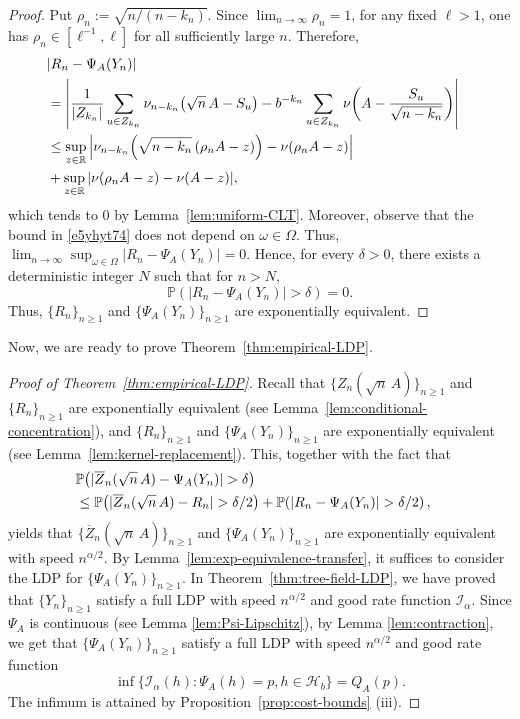 \documentclass[a4paper, 11pt]{article}
\newcommand{\1}{\mathbf 1}
\theoremstyle{plain}
\begin{document}
\begin{proof}
Put \(\rho_n:=\sqrt{n/(n-k_n)}\). Since $\lim_{n\to\infty}\rho_n=1$, for any fixed \(\ell>1\), one has
\(\rho_n\in[\ell^{-1},\ell]\) for all sufficiently large \(n\). Therefore,
\begin{align}\label{e5yhyt74}
  &|R_n-\Psi_A(Y_n)|\cr
  &=\left|\frac{1}{|Z_{k_n}|}\sum_{u\in Z_{k_n}}
  \nu_{n-k_n}\!\left(\sqrt n\,A-S_u\right)- b^{-k_n}\sum_{u\in Z_{k_n}}
  \nu\!\left(A-\frac{S_u}{\sqrt{n-k_n}}\right)\right|\cr
  &\leq
  \sup_{z\in\mathbb{R}}
  \left|
    \nu_{n-k_n}\!\left(\sqrt{n-k_n}\,(\rho_nA-z)\right)
    -\nu(\rho_nA-z)
  \right|\cr
  &+\sup_{z\in\mathbb{R}}|\nu(\rho_nA-z)-\nu(A-z)|,
\end{align}
which tends to $0$ by Lemma~\ref{lem:uniform-CLT}. Moreover, observe that the bound in \eqref{e5yhyt74} does not depend
on $\omega\in\Omega$. Thus, $\lim_{n\to\infty}\sup_{\omega\in \Omega}|R_n-\Psi_A(Y_n)|=0$. Hence, for every \(\delta>0\), there exists a deterministic integer $N$ such that for $n>N$,
\[
  \mathbb{P}(|R_n-\Psi_A(Y_n)|>\delta)=0.
\]
Thus, \(\{R_n\}_{n\geq1}\) and \(\{\Psi_A(Y_n)\}_{n\geq1}\) are exponentially equivalent.
\end{proof}
Now, we are ready to prove Theorem~\ref{thm:empirical-LDP}.
\begin{proof}[Proof of Theorem~\ref{thm:empirical-LDP}]



Recall that $\{Z_n(\sqrt n\,A)\}_{n\geq1}$ and $\{R_n\}_{n\geq1}$ are exponentially
equivalent (see Lemma~\ref{lem:conditional-concentration}), and $\{R_n\}_{n\geq1}$ and \(\{\Psi_A(Y_n)\}_{n\geq1}\) are exponentially
equivalent (see Lemma~\ref{lem:kernel-replacement}). This, together with the fact that
\begin{align*}
  &\mathbb{P}\!\left(
    |\overline Z_n(\sqrt n\,A)-\Psi_A(Y_n)|>\delta
  \right)\cr
  &\leq
  \mathbb{P}\!\left(
    |\overline Z_n(\sqrt n\,A)-R_n|>\delta/2
  \right)+
  \mathbb{P}\!\left(|R_n-\Psi_A(Y_n)|>\delta/2\right),
\end{align*}
yields that
\(\{\overline Z_n(\sqrt n\,A)\}_{n\geq1}\) and \(\{\Psi_A(Y_n)\}_{n\geq1}\) are exponentially
equivalent with speed $n^{\alpha/2}$. By Lemma~\ref{lem:exp-equivalence-transfer}, it suffices to consider the LDP for \(\{\Psi_A(Y_n)\}_{n\geq1}\). In Theorem~\ref{thm:tree-field-LDP}, we have proved that  \(\{Y_n\}_{n\geq1}\) satisfy a full LDP with speed
\(n^{\alpha/2}\) and good rate function \(\mathcal{I_{\alpha}}\). Since $\Psi_A$ is continuous (see Lemma \ref{lem:Psi-Lipschitz}), by Lemma \ref{lem:contraction}, we get that $\{\Psi_A(Y_n)\}_{n\geq1}$
satisfy a full LDP with speed \(n^{\alpha/2}\) and good rate function
$$
\inf\{\mathcal{I_{\alpha}}(h):\Psi_A(h)=p, h\in\mathcal{H}_b\}=Q_A(p).
 $$
The infimum is attained by Proposition~\ref{prop:cost-bounds} (iii).
\end{proof}
\end{document}
